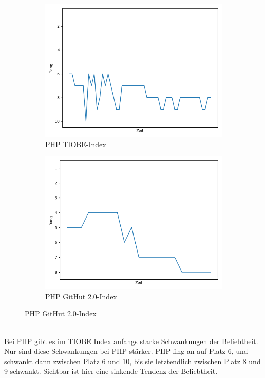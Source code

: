 \documentclass[ngerman]{article}
\begin{document}
    \begin{figure}[h!]
        \begin{subfigure}[h!]{.5\textwidth}
            \caption{PHP TIOBE-Index}
            \centering
            \includegraphics[scale=.25]{PHPTIOBE.png}
        \end{subfigure}
        \begin{subfigure}[h!]{.5\textwidth}
            \caption{PHP GitHut 2.0-Index}
            \centering
            \includegraphics[scale=.25]{PHPGitHut.png}
        \end{subfigure}
    \end{figure}\\
    Bei PHP gibt es im TIOBE Index anfangs starke Schwankungen der Beliebtheit. Nur sind diese Schwankungen bei PHP stärker. PHP fing an auf Platz 6, und schwankt dann zwischen Platz 6 und 10, bis sie letztendlich zwischen Platz 8 und 9 schwankt. Sichtbar ist hier eine sinkende Tendenz der Beliebtheit.\\
\end{document}
